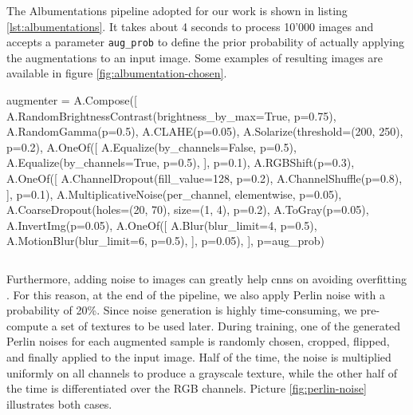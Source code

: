 \medskip

The Albumentations pipeline adopted for our work is shown in listing \ref{lst:albumentations}. It takes about 4 seconds to process 10'000 images and accepts a parameter \texttt{aug\_prob} to define the prior probability of actually applying the augmentations to an input image. Some examples of resulting images are available in figure \ref{fig:albumentation-chosen}.

\vspace{0.1cm}
\begin{python}
augmenter = A.Compose([
	A.RandomBrightnessContrast(brightness_by_max=True, p=0.75),
	A.RandomGamma(p=0.5),
	A.CLAHE(p=0.05),
	A.Solarize(threshold=(200, 250), p=0.2),
	A.OneOf([
		A.Equalize(by_channels=False, p=0.5),
		A.Equalize(by_channels=True, p=0.5),
	], p=0.1),
	A.RGBShift(p=0.3),
	A.OneOf([
		A.ChannelDropout(fill_value=128, p=0.2),
		A.ChannelShuffle(p=0.8),
	], p=0.1),
	A.MultiplicativeNoise(per_channel, elementwise, p=0.05),
	A.CoarseDropout(holes=(20, 70), size=(1, 4), p=0.2),
	A.ToGray(p=0.05),
	A.InvertImg(p=0.05),
	A.OneOf([
		A.Blur(blur_limit=4, p=0.5),
		A.MotionBlur(blur_limit=6, p=0.5),
	], p=0.05),
], p=aug_prob)
\end{python}
\vspace{-0.5cm}
\begin{lstlisting}[frame=none,caption={Chosen Albumentations pipeline}, 
label=lst:albumentations]
\end{lstlisting}

Furthermore, adding noise to images can greatly help \gls{cnn}s on avoiding overfitting \cite{shorten2019augmentationsurvey}. For this reason, at the end of the pipeline, we also apply Perlin noise \cite{perlin-noise} with a probability of 20\%. Since noise generation is highly time-consuming, we pre-compute a set of textures to be used later. During training, one of the generated Perlin noises for each augmented sample is randomly chosen, cropped, flipped, and finally applied to the input image. Half of the time, the noise is multiplied uniformly on all channels to produce a grayscale texture, while the other half of the time is differentiated over the RGB channels. Picture \ref{fig:perlin-noise} illustrates both cases.

